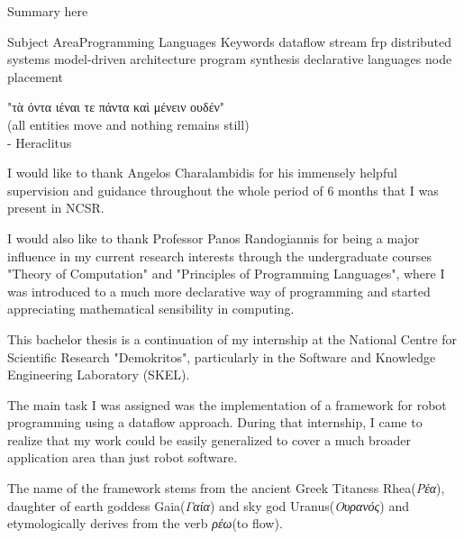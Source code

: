 \documentclass{dithesis}
\begin{document}
\maketitle

\begin{thesisabstract}[Abstract]
Summary here

\thesiskeywords
{Subject Area}{Programming Languages}
{Keywords}
	{dataflow}
	{stream}
	{frp}
	{distributed systems}
	{model-driven architecture}
	{program synthesis}
	{declarative languages}
	{node placement}
\end{thesisabstract}

\begin{thesisdedication}
"τὰ όντα ιέναι τε πάντα καὶ μένειν ουδέν" \\
(all entities move and nothing remains still) \\
- Heraclitus
\end{thesisdedication}

\begin{thesisacknowledgments}[Acknowledgements]

I would like to thank Angelos Charalambidis for his immensely helpful supervision and guidance throughout the whole period of 6 months that I was present in NCSR. 

I would also like to thank Professor Panos Randogiannis for being a major influence in my current research interests through the undergraduate courses "Theory of Computation" and "Principles of Programming Languages", where I was introduced to a much more declarative way of programming and started appreciating mathematical sensibility in computing.

\end{thesisacknowledgments}

\tableofcontents
\listoffigures

\begin{thesisprologue}[Prologue]

This bachelor thesis is a continuation of my internship at the National Centre for Scientific Research "Demokritos", particularly in the Software and Knowledge Engineering Laboratory (SKEL). 

The main task I was assigned was the implementation of a framework for robot programming using a dataflow approach. During that internship, I came to realize that my work could be easily generalized to cover a much broader application area than just robot software. 

The name of the framework stems from the ancient Greek Titaness Rhea(\textit{Ρέα}), daughter of earth goddess Gaia(\textit{Γαία}) and sky god Uranus(\textit{Ουρανός}) and etymologically derives from the verb \textit{ρέω}(to flow).

\end{thesisprologue}
\end{document}

